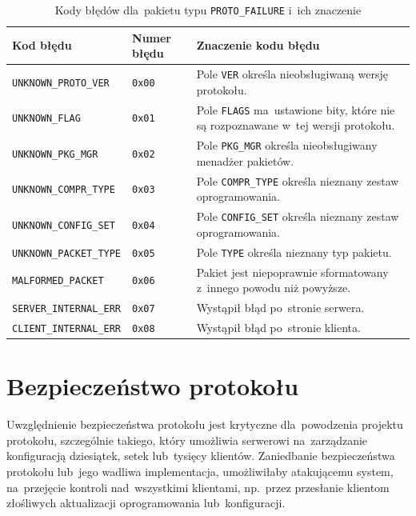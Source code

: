 \documentclass[thesis]{subfiles}
\begin{document}
\begin{table}
\centering
\renewcommand{\arraystretch}{1.3}
\begin{tabular}{l|p{1.5cm}|p{8.5cm}}
	Kod błędu                      & Numer błędu   & Znaczenie kodu błędu\\\hline\hline
	\texttt{UNKNOWN\_PROTO\_VER}   & \texttt{0x00} & Pole \texttt{VER} określa nieobsługiwaną wersję protokołu.\\\hline
	\texttt{UNKNOWN\_FLAG}         & \texttt{0x01} & Pole \texttt{FLAGS} ma~ustawione bity, które nie są rozpoznawane w~tej wersji protokołu.\\\hline
	\texttt{UNKNOWN\_PKG\_MGR}     & \texttt{0x02} & Pole \texttt{PKG\_MGR} określa nieobsługiwany menadżer pakietów.\\\hline
	\texttt{UNKNOWN\_COMPR\_TYPE}  & \texttt{0x03} & Pole \texttt{COMPR\_TYPE} określa nieznany zestaw oprogramowania.\\\hline
	\texttt{UNKNOWN\_CONFIG\_SET}  & \texttt{0x04} & Pole \texttt{CONFIG\_SET} określa nieznany zestaw oprogramowania.\\\hline
	\texttt{UNKNOWN\_PACKET\_TYPE} & \texttt{0x05} & Pole \texttt{TYPE} określa nieznany typ pakietu.\\\hline
	\texttt{MALFORMED\_PACKET}     & \texttt{0x06} & Pakiet jest niepoprawnie sformatowany z~innego powodu niż powyższe.\\\hline
	\texttt{SERVER\_INTERNAL\_ERR} & \texttt{0x07} & Wystąpił błąd po~stronie serwera.\\\hline
	\texttt{CLIENT\_INTERNAL\_ERR} & \texttt{0x08} & Wystąpił błąd po~stronie klienta.
\end{tabular}
\caption{Kody błędów dla~pakietu typu \texttt{PROTO\_FAILURE} i~ich znaczenie}
\label{fig:packet-protocol-failure-desc}
\end{table}


\section{Bezpieczeństwo protokołu}
\label{sec:security}

Uwzględnienie bezpieczeństwa protokołu jest krytyczne dla~powodzenia projektu protokołu, szczególnie takiego, który umożliwia serwerowi na~zarządzanie konfiguracją dziesiątek, setek lub~tysięcy klientów. Zaniedbanie bezpieczeństwa protokołu lub~jego wadliwa implementacja, umożliwiłaby atakującemu system, na~przejęcie kontroli nad~wszystkimi klientami, np.~przez przesłanie klientom złośliwych aktualizacji oprogramowania lub~konfiguracji.
\end{document}
